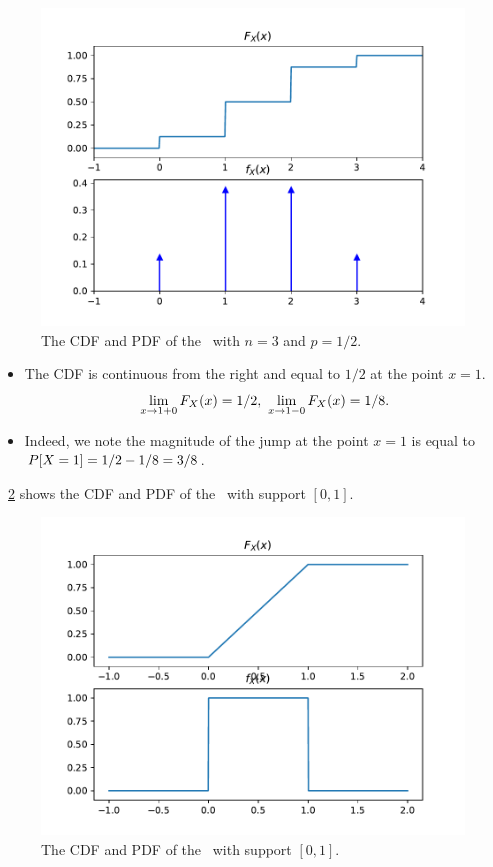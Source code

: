 	\begin{figure}\begin{center}
	\includegraphics[width=.7\linewidth]{figures/cdfpdf1}
	\caption{The CDF and PDF of the \binomrv\ with $n=3$ and $p=1/2$.}
	\label{fig-cdfpdf1}
	\end{center}\end{figure}

	\begin{itemize}
		\item The CDF is continuous from the right
		and equal to $1/2$ at the point $x = 1$.
		\[
			\lim_{x\to 1+0} F_{X}(x) = 1/2,\
			\lim_{x\to 1-0} F_{X}(x) = 1/8.
		\]

		\item
		Indeed, we note the magnitude of the jump
		at the point $x = 1$ is equal to
		$P[X = 1] = 1/2 - 1/8 = 3/8$.
	\end{itemize}


	\item {}
	\figurename~\ref{fig-unif-ff}
	shows the CDF and PDF
	of the \unifrv\ with support $[0,1]$.

	\begin{figure}\begin{center}
	\includegraphics[width=.7\linewidth]{figures/unif_ff}
	\caption{The CDF and PDF of the \unifrv\ with support $[0,1]$.}
	\label{fig-unif-ff}
	\end{center}\end{figure}

